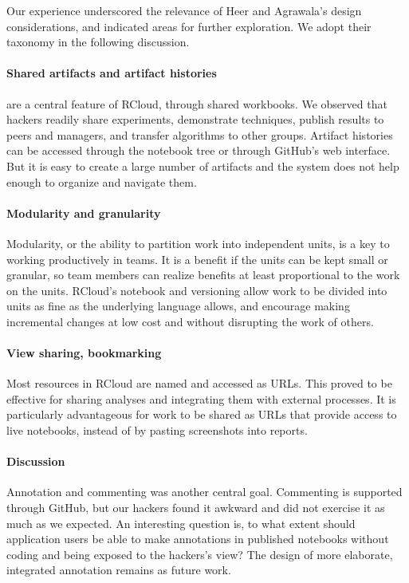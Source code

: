 Our experience underscored the relevance of Heer and Agrawala's design
considerations, and indicated areas for further exploration. We adopt
their taxonomy in the following discussion.

\paragraph*{Shared artifacts and artifact histories} are a central feature
of RCloud, through shared workbooks. We observed that hackers readily
share experiments, demonstrate techniques, publish results to peers and
managers, and transfer algorithms to other groups. Artifact histories
can be accessed through the notebook tree or through GitHub's web interface.
But it is easy to create a large number of artifacts
and the system does not help enough to organize and navigate them.

\paragraph*{Modularity and granularity} Modularity, or the ability
to partition work into independent units, is a key to working
productively in teams.
It is a benefit if the units can be kept small or granular, so team members
can realize benefits at least proportional to the work on the units.
RCloud's notebook and versioning allow work to be divided
into units as fine as the underlying language allows, and
encourage making incremental changes at low cost and without disrupting
the work of others.

\paragraph*{View sharing, bookmarking} Most resources in RCloud are named
and accessed as URLs. This proved to be effective for sharing analyses
and integrating them with external processes.  It is particularly
advantageous for work to be shared as URLs that provide access to live
notebooks, instead of by pasting screenshots into reports.

\paragraph*{Discussion} Annotation and commenting was another central goal.
Commenting is supported through GitHub, but our hackers found it
awkward and did not exercise it as much as we expected.
An interesting question is, to what extent should application users
be able to make annotations in published notebooks without coding
and being exposed to the hackers's view? The design of
more elaborate, integrated annotation remains as future work.

